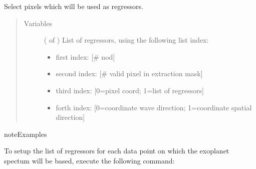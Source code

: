 \documentclass[a4paper,10pt,english]{sphinxmanual}
\begin{document}
\begin{fulllineitems}
\begin{fulllineitems}
\label{\detokenize{cascade.TSO:cascade.TSO.TSO.TSOSuite.select_regressors}}
Select pixels which will be used as regressors.
\begin{quote}\begin{description}
\item[{Variables}] \leavevmode
{} ( of ) \textendash{} 
List of regressors, using the following list index:
\begin{itemize}
\item {} 
first index: {[}\# nod{]}

\item {} 
second index: {[}\# valid pixel in extraction mask{]}

\item {} 
third index: {[}0=pixel coord; 1=list of regressors{]}

\item {} 
forth index: {[}0=coordinate wave direction;
1=coordinate spatial direction{]}

\end{itemize}


\end{description}\end{quote}

\begin{sphinxadmonition}{note}{Examples}

To setup the list of regressors for each data point on which the
exoplanet spectum will be based, execute the following command:

%
\begin{sphinxVerbatim}[commandchars=\\\{\}]
\end{sphinxVerbatim}
\end{sphinxadmonition}

\end{fulllineitems}



\end{fulllineitems}
\end{document}

